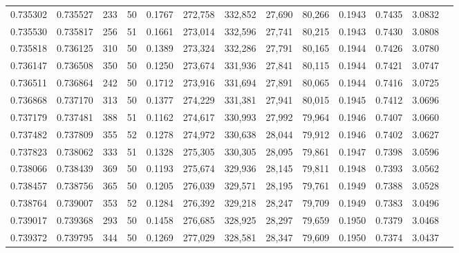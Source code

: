 \begin{tabular}{rrrrrrrrrrrrr}
0.735302 & 0.735527 &   233 &  50 &                                     0.1767 & 272,758 & 332,852 &  27,690 &  80,266 & 0.1943 & 0.7435 & 3.0832 \\
0.735530 & 0.735817 &   256 &  51 &                                     0.1661 & 273,014 & 332,596 &  27,741 &  80,215 & 0.1943 & 0.7430 & 3.0808 \\
0.735818 & 0.736125 &   310 &  50 &                                     0.1389 & 273,324 & 332,286 &  27,791 &  80,165 & 0.1944 & 0.7426 & 3.0780 \\
0.736147 & 0.736508 &   350 &  50 &                                     0.1250 & 273,674 & 331,936 &  27,841 &  80,115 & 0.1944 & 0.7421 & 3.0747 \\
0.736511 & 0.736864 &   242 &  50 &                                     0.1712 & 273,916 & 331,694 &  27,891 &  80,065 & 0.1944 & 0.7416 & 3.0725 \\
0.736868 & 0.737170 &   313 &  50 &                                     0.1377 & 274,229 & 331,381 &  27,941 &  80,015 & 0.1945 & 0.7412 & 3.0696 \\
0.737179 & 0.737481 &   388 &  51 &                                     0.1162 & 274,617 & 330,993 &  27,992 &  79,964 & 0.1946 & 0.7407 & 3.0660 \\
0.737482 & 0.737809 &   355 &  52 &                                     0.1278 & 274,972 & 330,638 &  28,044 &  79,912 & 0.1946 & 0.7402 & 3.0627 \\
0.737823 & 0.738062 &   333 &  51 &                                     0.1328 & 275,305 & 330,305 &  28,095 &  79,861 & 0.1947 & 0.7398 & 3.0596 \\
0.738066 & 0.738439 &   369 &  50 &                                     0.1193 & 275,674 & 329,936 &  28,145 &  79,811 & 0.1948 & 0.7393 & 3.0562 \\
0.738457 & 0.738756 &   365 &  50 &                                     0.1205 & 276,039 & 329,571 &  28,195 &  79,761 & 0.1949 & 0.7388 & 3.0528 \\
0.738764 & 0.739007 &   353 &  52 &                                     0.1284 & 276,392 & 329,218 &  28,247 &  79,709 & 0.1949 & 0.7383 & 3.0496 \\
0.739017 & 0.739368 &   293 &  50 &                                     0.1458 & 276,685 & 328,925 &  28,297 &  79,659 & 0.1950 & 0.7379 & 3.0468 \\
0.739372 & 0.739795 &   344 &  50 &                                     0.1269 & 277,029 & 328,581 &  28,347 &  79,609 & 0.1950 & 0.7374 & 3.0437 \\

\end{tabular}

